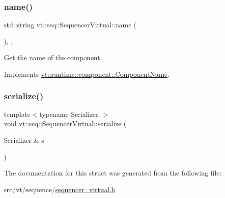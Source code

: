 \subsubsection{\texorpdfstring{name()}{name()}}
{\footnotesize\ttfamily std\+::string vt\+::seq\+::\+Sequencer\+Virtual\+::name (\begin{DoxyParamCaption}{ }\end{DoxyParamCaption})\hspace{0.3cm}{\ttfamily [inline]}, {\ttfamily [override]}, {\ttfamily [virtual]}}



Get the name of the component. 



Implements \hyperlink{structvt_1_1runtime_1_1component_1_1_component_name_a33c06229bb605a2b2ceff68830d6d773}{vt\+::runtime\+::component\+::\+Component\+Name}.

\mbox{\label{structvt_1_1seq_1_1_sequencer_virtual_a03ee6d091406db4482bff88cf1f66af4}} 
\subsubsection{\texorpdfstring{serialize()}{serialize()}}
{\footnotesize\ttfamily template$<$typename Serializer $>$ \\
void vt\+::seq\+::\+Sequencer\+Virtual\+::serialize (\begin{DoxyParamCaption}\item[{Serializer \&}]{s }\end{DoxyParamCaption})\hspace{0.3cm}{\ttfamily [inline]}}



The documentation for this struct was generated from the following file\+:\begin{DoxyCompactItemize}
\item 
src/vt/sequence/\hyperlink{sequencer__virtual_8h}{sequencer\+\_\+virtual.\+h}\end{DoxyCompactItemize}
